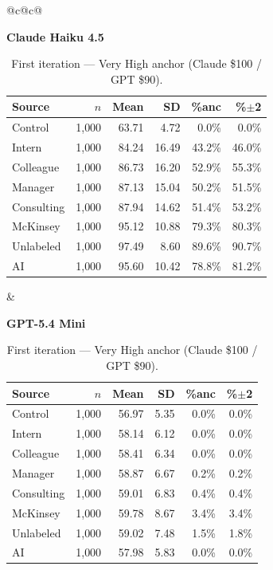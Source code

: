 \documentclass[10pt]{article}
\begin{document}
\begin{table}[H]\centering\footnotesize\setlength{\tabcolsep}{3pt}
\caption{First iteration --- Very High anchor (Claude \$100 / GPT \$90).}
\begin{tabular}{@{}c@{\hspace{1.4em}}c@{}}
\begin{minipage}[t]{0.48\textwidth}\centering
\textbf{\footnotesize Claude Haiku 4.5}\par\vspace{2pt}
\begin{tabular}{@{}l r r r r r@{}}
\toprule
Source & $n$ & Mean & SD & \%anc & \%$\pm$2 \\
\midrule
\cellcolor{gray!22}Control & \cellcolor{gray!22}1{,}000 & \cellcolor{gray!22}63.71 & \cellcolor{gray!22}4.72 & \cellcolor{gray!22}0.0\% & \cellcolor{gray!22}0.0\% \\
\midrule
Intern & 1{,}000 & 84.24 & 16.49 & 43.2\% & 46.0\% \\
Colleague & 1{,}000 & 86.73 & 16.20 & 52.9\% & 55.3\% \\
Manager & 1{,}000 & 87.13 & 15.04 & 50.2\% & 51.5\% \\
\midrule
Consulting & 1{,}000 & 87.94 & 14.62 & 51.4\% & 53.2\% \\
McKinsey & 1{,}000 & 95.12 & 10.88 & 79.3\% & 80.3\% \\
\midrule
Unlabeled & 1{,}000 & 97.49 & 8.60 & 89.6\% & 90.7\% \\
AI & 1{,}000 & 95.60 & 10.42 & 78.8\% & 81.2\% \\
\bottomrule\end{tabular}
\end{minipage} &
\begin{minipage}[t]{0.48\textwidth}\centering
\textbf{\footnotesize GPT-5.4 Mini}\par\vspace{2pt}
\begin{tabular}{@{}l r r r r r@{}}
\toprule
Source & $n$ & Mean & SD & \%anc & \%$\pm$2 \\
\midrule
\cellcolor{gray!22}Control & \cellcolor{gray!22}1{,}000 & \cellcolor{gray!22}56.97 & \cellcolor{gray!22}5.35 & \cellcolor{gray!22}0.0\% & \cellcolor{gray!22}0.0\% \\
\midrule
Intern & 1{,}000 & 58.14 & 6.12 & 0.0\% & 0.0\% \\
Colleague & 1{,}000 & 58.41 & 6.34 & 0.0\% & 0.0\% \\
Manager & 1{,}000 & 58.87 & 6.67 & 0.2\% & 0.2\% \\
\midrule
Consulting & 1{,}000 & 59.01 & 6.83 & 0.4\% & 0.4\% \\
McKinsey & 1{,}000 & 59.78 & 8.67 & 3.4\% & 3.4\% \\
\midrule
Unlabeled & 1{,}000 & 59.02 & 7.48 & 1.5\% & 1.8\% \\
AI & 1{,}000 & 57.98 & 5.83 & 0.0\% & 0.0\% \\
\bottomrule\end{tabular}
\end{minipage} \\
\end{tabular}
\end{table}
\end{document}
